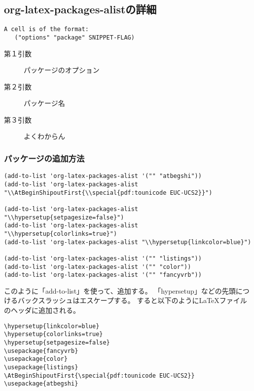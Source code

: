 \documentclass[dvipdfmx,12pt]{jsarticle}
\begin{document}
\subsection{org-latex-packages-alistの詳細}
\label{sec-3-3}

\lstset{language=Lisp,label= ,caption= ,numbers=none}
\begin{lstlisting}
A cell is of the format:
   ("options" "package" SNIPPET-FLAG)
\end{lstlisting}

\begin{description}
\item[{第１引数}] パッケージのオプション
\item[{第２引数}] パッケージ名
\item[{第３引数}] よくわからん
\end{description}

\subsubsection{パッケージの追加方法}
\label{sec-3-3-1}

\lstset{language=Lisp,label= ,caption= ,numbers=none}
\begin{lstlisting}
(add-to-list 'org-latex-packages-alist '("" "atbegshi"))
(add-to-list 'org-latex-packages-alist "\\AtBeginShipoutFirst{\\special{pdf:tounicode EUC-UCS2}}")

(add-to-list 'org-latex-packages-alist "\\hypersetup{setpagesize=false}")
(add-to-list 'org-latex-packages-alist "\\hypersetup{colorlinks=true}")
(add-to-list 'org-latex-packages-alist "\\hypersetup{linkcolor=blue}")

(add-to-list 'org-latex-packages-alist '("" "listings"))
(add-to-list 'org-latex-packages-alist '("" "color"))
(add-to-list 'org-latex-packages-alist '("" "fancyvrb"))
\end{lstlisting}

このように「add-to-list」を使って、追加する。
「hypersetup」などの先頭につけるバックスラッシュはエスケープする。
すると以下のように\LaTeX{}ファイルのヘッダに追加される。

\lstset{language=[LaTeX]TeX,label= ,caption= ,numbers=none}
\begin{lstlisting}
\hypersetup{linkcolor=blue}
\hypersetup{colorlinks=true}
\hypersetup{setpagesize=false}
\usepackage{fancyvrb}
\usepackage{color}
\usepackage{listings}
\AtBeginShipoutFirst{\special{pdf:tounicode EUC-UCS2}}
\usepackage{atbegshi}
\end{lstlisting}
\end{document}
